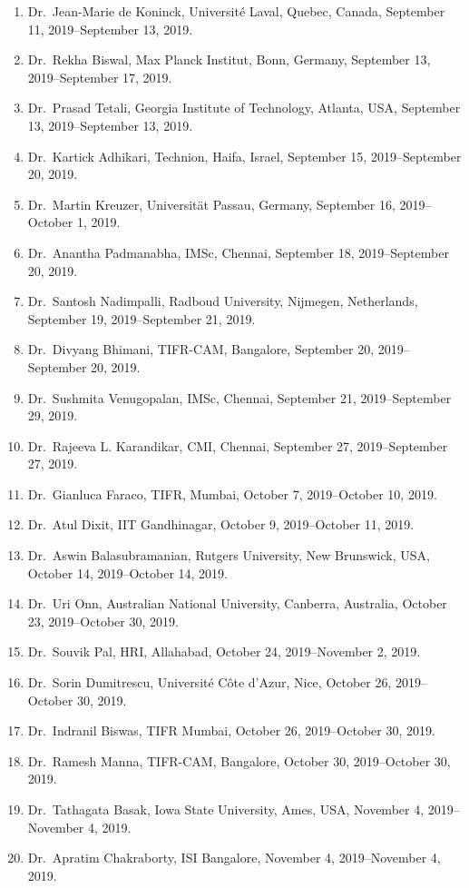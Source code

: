 \begin{enumerate}
\item Dr.~Jean-Marie de Koninck, Université Laval, Quebec, Canada, September 11, 2019--September 13, 2019.
\item Dr.~Rekha Biswal, Max Planck Institut, Bonn, Germany, September 13, 2019--September 17, 2019.
\item Dr.~Prasad Tetali, Georgia Institute of Technology, Atlanta, USA, September 13, 2019--September 13, 2019.
\item Dr.~Kartick Adhikari, Technion, Haifa, Israel, September 15, 2019--September 20, 2019.
\item Dr.~Martin Kreuzer, Universität Passau, Germany, September 16, 2019--October 1, 2019.
\item Dr.~Anantha Padmanabha, IMSc, Chennai, September 18, 2019--September 20, 2019.
\item Dr.~Santosh Nadimpalli, Radboud University, Nijmegen, Netherlands, September 19, 2019--September 21, 2019.
\item Dr.~Divyang Bhimani, TIFR-CAM, Bangalore, September 20, 2019--September 20, 2019.
\item Dr.~Sushmita Venugopalan, IMSc, Chennai, September 21, 2019--September 29, 2019.
\item Dr.~Rajeeva L. Karandikar, CMI, Chennai, September 27, 2019--September 27, 2019.
\item Dr.~Gianluca Faraco, TIFR, Mumbai, October 7, 2019--October 10, 2019.
\item Dr.~Atul Dixit, IIT Gandhinagar, October 9, 2019--October 11, 2019.
\item Dr.~Aswin Balasubramanian, Rutgers University, New Brunswick, USA, October 14, 2019--October 14, 2019.
\item Dr.~Uri Onn, Australian National University, Canberra, Australia, October 23, 2019--October 30, 2019.
\item Dr.~Souvik Pal, HRI, Allahabad, October 24, 2019--November 2, 2019.
\item Dr.~Sorin Dumitrescu, Université Côte d'Azur, Nice, October 26, 2019--October 30, 2019.
\item Dr.~Indranil Biswas, TIFR Mumbai, October 26, 2019--October 30, 2019.
\item Dr.~Ramesh Manna, TIFR-CAM, Bangalore, October 30, 2019--October 30, 2019.
\item Dr.~Tathagata Basak, Iowa State University, Ames, USA, November 4, 2019--November 4, 2019.
\item Dr.~Apratim Chakraborty, ISI Bangalore, November 4, 2019--November 4, 2019.

\end{enumerate}
